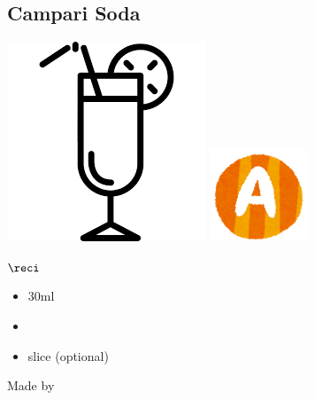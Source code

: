 \subsection{Campari Soda}
\vspace{-7mm}
\hspace{40mm}
\includegraphics[scale=.07]{cocktail_glass_tall.png}
\includegraphics[scale=.12]{capital_a.png}
\vspace{2.5mm}
\begin{itembox}[l]{\boldmath $\reci$}
\begin{itemize}
\setlength{\parskip}{0cm}
\setlength{\itemsep}{0cm}
\item \campari 30ml
\item \soda
\item \orange slice (optional)
\end{itemize}
\vspace{-4mm}
Made by \build
\end{itembox}
